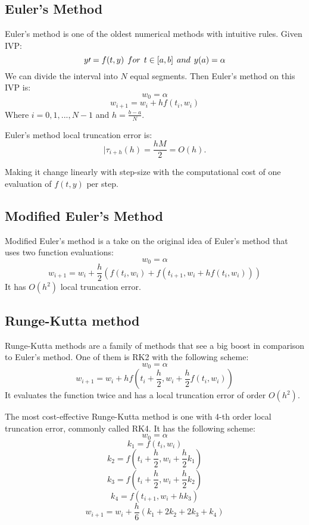 \documentclass[11pt]{article}	%
\begin{document}
\subsection{Euler's Method}
Euler's method is one of the oldest numerical methods with intuitive rules. Given IVP:
$$y\prime = f(t, y) \hspace{0.15cm} for \hspace{0.15cm} t \in [a, b] \hspace{0.15cm} and \hspace{0.15cm} y(a) = \alpha $$ 
We can divide the interval into $N$ equal segments. Then Euler's method on this IVP is: 
$$w_0 = \alpha $$
$$w_{i+1} = w_i + hf(t_i, w_i)$$
Where $i = 0,1,..., N-1$ and $h = \frac{b-a}{N}$. 

Euler's method local truncation error is: 
$$|\tau _{i+h}(h) = \frac{hM}{2} = O(h).$$

Making it change linearly with step-size with the computational cost of one evaluation of $f(t, y)$ per step. 

\subsection{Modified Euler's Method}
Modified Euler's method is a take on the original idea of Euler's method that uses two function evaluations:
$$w_0 = \alpha $$
$$w_{i+1} = w_i + \frac{h}{2}(f(t_i,w_i) + f(t_{i+1}, w_i + hf(t_i,w_i)))$$
It has $O(h^2)$ local truncation error. 


\subsection{Runge-Kutta method}
Runge-Kutta methods are a family of methods that see a big boost in comparison to Euler's method. One of them is RK2 with the following scheme:
$$w_0 = \alpha $$
$$w_{i+1} = w_i + hf(t_i + \frac{h}{2}, w_i + \frac{h}{2}f(t_i, w_i))$$
It evaluates the function twice and has a local truncation error of order $O(h^2)$.

The most cost-effective Runge-Kutta method is one with 4-th order local truncation error, commonly called RK4. It has the following scheme:
$$w_0 = \alpha $$
$$k_1 = f(t_i, w_i)$$
$$k_2 = f(t_i + \frac{h}{2}, w_i + \frac{h}{2}k_1)$$
$$k_3 = f(t_i + \frac{h}{2}, w_i + \frac{h}{2}k_2)$$
$$k_4 = f(t_{i+1}, w_i + hk_3)$$
$$w_{i+1} = w_i + \frac{h}{6}(k_1 + 2k_2 + 2k_3 + k_4)$$
\end{document}
